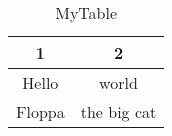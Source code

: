 \documentclass{article}
\begin{document}
	\begin{table}[h!]
		\centering
		\caption{MyTable}
		\begin{tabular}{|c|c|}
			\hline
			1 & 2 \\ \hline 
			Hello & world \\ \hline 
			Floppa & the big cat \\ \hline 
		\end{tabular}
	\end{table}
\end{document}
